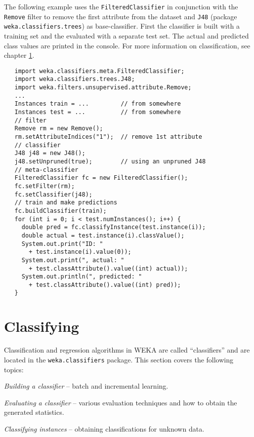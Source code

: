 The following example uses the
\texttt{FilteredClassifier} in conjunction with the \texttt{Remove} filter to
remove the first attribute from the dataset and \texttt{J48} (package
\texttt{weka.classifiers.trees}) as base-classifier. First the classifier is
built with a training set and the evaluated with a separate test set. The
actual and predicted class values are printed in the console. For more
information on classification, see chapter \ref{api_classiyfing}.
\begin{verbatim}
   import weka.classifiers.meta.FilteredClassifier;
   import weka.classifiers.trees.J48;
   import weka.filters.unsupervised.attribute.Remove;
   ...
   Instances train = ...         // from somewhere
   Instances test = ...          // from somewhere
   // filter
   Remove rm = new Remove();
   rm.setAttributeIndices("1");  // remove 1st attribute
   // classifier
   J48 j48 = new J48();
   j48.setUnpruned(true);        // using an unpruned J48
   // meta-classifier
   FilteredClassifier fc = new FilteredClassifier();
   fc.setFilter(rm);
   fc.setClassifier(j48);
   // train and make predictions
   fc.buildClassifier(train);
   for (int i = 0; i < test.numInstances(); i++) {
     double pred = fc.classifyInstance(test.instance(i));
     double actual = test.instance(i).classValue();
     System.out.print("ID: "
       + test.instance(i).value(0));
     System.out.print(", actual: "
       + test.classAttribute().value((int) actual));
     System.out.println(", predicted: "
       + test.classAttribute().value((int) pred));
   }
\end{verbatim}

\newpage

\section{Classifying}
\label{api_classiyfing}
Classification and regression algorithms in WEKA are called ``classifiers'' and
are located in the \texttt{weka.classifiers} package. This section covers the
following topics:
\begin{tight_itemize}
	\item \textit{Building a classifier} -- batch and incremental learning.
	\item \textit{Evaluating a classifier} -- various evaluation techniques and
how to obtain the generated statistics.
	\item \textit{Classifying instances} -- obtaining classifications for
unknown data.
\end{tight_itemize}


